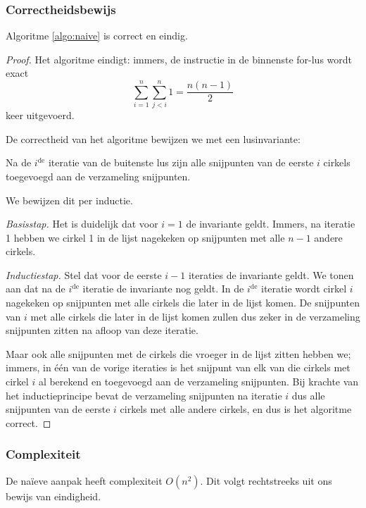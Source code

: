 \subsubsection{Correctheidsbewijs}
\begin{stl} Algoritme \ref{algo:naive} is correct en eindig.\end{stl}
\begin{proof}
Het algoritme eindigt: immers, de instructie in de binnenste for-lus
wordt exact \[\sum_{i=1}^{n} \sum_{j<i}^{n} 1 = \frac{n(n-1)}{2} \]
keer uitgevoerd. 

De correctheid van het algoritme bewijzen we met een lusinvariante:
\begin{inv} 
Na de $i^{\textrm{de}}$ iteratie van de buitenste lus zijn
alle snijpunten van de eerste $i$ cirkels toegevoegd aan de
verzameling snijpunten. 
\end{inv} 

We bewijzen dit per inductie.

\textit{Basisstap.} Het is duidelijk dat voor $i = 1$ de invariante
geldt. Immers, na iteratie 1 hebben we cirkel 1 in de lijst nagekeken
op snijpunten met alle $n-1$ andere cirkels.

\textit{Inductiestap.} Stel dat voor de eerste $i - 1$ iteraties de
invariante geldt. We tonen aan dat na de $i^{\textrm{de}}$
iteratie de invariante nog geldt. In de $i^{\textrm{de}}$ iteratie
wordt cirkel $i$ nagekeken op snijpunten met alle cirkels die later in
de lijst komen. De snijpunten van $i$ met alle cirkels die later in de
lijst komen zullen dus zeker in de verzameling snijpunten zitten na
afloop van deze iteratie. 

Maar ook alle snijpunten met de cirkels die vroeger in de lijst zitten
hebben we; immers, in \'e\'en van de vorige iteraties is het snijpunt
van elk van die cirkels met cirkel $i$ al berekend en toegevoegd aan
de verzameling snijpunten. Bij krachte van het inductieprincipe bevat
de verzameling snijpunten na iteratie $i$ dus alle snijpunten van de
eerste $i$ cirkels met alle andere cirkels, en dus is
het algoritme correct.
\end{proof}

\subsubsection{Complexiteit}
De na\"ieve aanpak heeft complexiteit $O(n^2)$. Dit volgt rechtstreeks uit ons bewijs van eindigheid.


